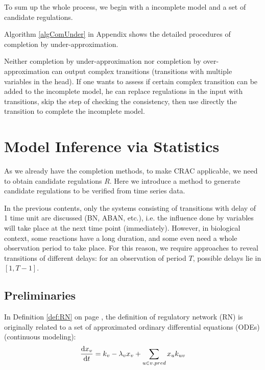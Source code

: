 To sum up the whole process, we begin with a incomplete model and a set of candidate regulations.


Algorithm \ref{algComUnder} in Appendix shows the detailed procedures of completion by under-approximation.

\begin{remark}
Neither completion by under-approximation nor completion by over-approximation can output complex transitions (transitions with multiple variables in the head).
If one wants to assess if certain complex transition can be added to the incomplete model, he can replace regulations in the input with transitions, skip the step of checking the consistency, then use directly the transition to complete the incomplete model.
\end{remark}

\section{Model Inference via Statistics}
As we already have the completion methods, to make CRAC applicable, we need to obtain candidate regulations $R$.
Here we introduce a method to generate candidate regulations to be verified from time series data.

In the previous contents, only the systems consisting of transitions with delay of 1 time unit are discussed (BN, ABAN, etc.), i.e. the influence done by variables will take place at the next time point (immediately).
However, in biological context, some reactions have a long duration, and some even need a whole observation period to take place.
For this reason, we require approaches to reveal transitions of different delays: for an observation of period $T$, possible delays lie in $[1,T-1]$.

\subsection{Preliminaries}
In Definition \ref{def:RN} on page \pageref{def:RN}, the definition of regulatory network (RN) is originally related to a set of approximated ordinary differential equations (ODEs) \cite{khalis2009smbionet} (continuous modeling):
\begin{equation}\label{eq:differentialEquation}
    \dfrac{{\rm d}x_v}{{\rm d}t}=k_v-\lambda_v x_v +\sum_{u\in v.pred}{x_uk_{uv}}
\end{equation}

